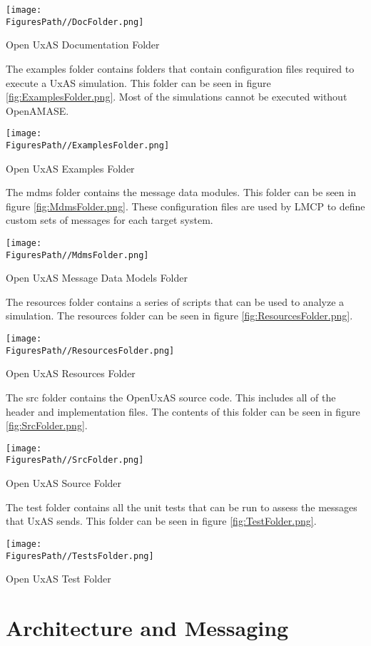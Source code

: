 \begin{marginfigure}[150pt]
	\texttt{[image: \\FiguresPath//DocFolder.png]}
	\caption{Open UxAS Documentation Folder}
	\label{fig:DocFolder.png}
\end{marginfigure}

The examples folder contains folders that contain configuration files
required to execute a UxAS simulation. This folder can be seen in figure
\ref{fig:ExamplesFolder.png}. Most of the simulations cannot be executed without
OpenAMASE.

\begin{marginfigure}[150pt]
	\texttt{[image: \\FiguresPath//ExamplesFolder.png]}
	\caption{Open UxAS Examples Folder}
	\label{fig:ExamplesFolder.png}
\end{marginfigure}

The mdms folder contains the message data modules. This folder can be
seen in figure \ref{fig:MdmsFolder.png}. These configuration files are used by
LMCP to define custom sets of messages for each target system.

\begin{marginfigure}[150pt]
	\texttt{[image: \\FiguresPath//MdmsFolder.png]}
	\caption{Open UxAS Message Data Models Folder}
	\label{fig:MdmsFolder.png}
\end{marginfigure}

The resources folder contains a series of scripts that can be used to
analyze a simulation. The resources folder can be seen in figure
\ref{fig:ResourcesFolder.png}.

\begin{marginfigure}[150pt]
	\texttt{[image: \\FiguresPath//ResourcesFolder.png]}
	\caption{Open UxAS Resources Folder}
	\label{fig:ResourcesFolder.png}
\end{marginfigure}

The src folder contains the OpenUxAS source code. This includes all of
the header and implementation files. The contents of this folder can be
seen in figure \ref{fig:SrcFolder.png}.

\begin{marginfigure}[150pt]
	\texttt{[image: \\FiguresPath//SrcFolder.png]}
	\caption{Open UxAS Source Folder}
	\label{fig:SrcFolder.png}
\end{marginfigure}

The test folder contains all the unit tests that can be run to assess
the messages that UxAS sends. This folder can be seen in figure
\ref{fig:TestFolder.png}.

\begin{marginfigure}[150pt]
	\texttt{[image: \\FiguresPath//TestsFolder.png]}
	\caption{Open UxAS Test Folder}
	\label{fig:TestFolder.png}
\end{marginfigure}

\section{Architecture and Messaging}\label{ArchitectureAndMessaging}
